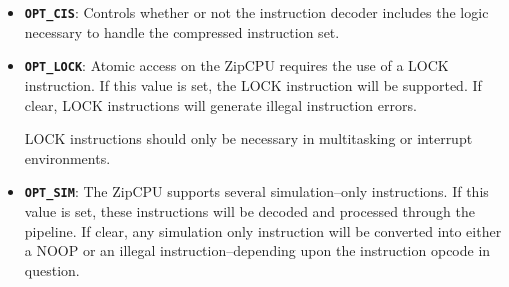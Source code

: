 \documentclass{gqtekspec}
\begin{document}
\begin{itemize}
\item {\bf\tt OPT\_CIS}: Controls whether or not the instruction decoder
	includes the logic necessary to handle the compressed instruction set.

\item {\bf\tt OPT\_LOCK}: Atomic access on the ZipCPU requires the use of a
	LOCK instruction.  If this value is set, the LOCK instruction will be
	supported.  If clear, LOCK instructions will generate illegal
	instruction errors.

	LOCK instructions should only be necessary in multitasking or
	interrupt environments.

\item {\bf\tt OPT\_SIM}: The ZipCPU supports several simulation--only
	instructions.  If this value is set, these instructions will be
	decoded and processed through the pipeline.  If clear, any simulation
	only instruction will be converted into either a NOOP or an illegal
	instruction--depending upon the instruction opcode in question.
\end{itemize}
\end{document}
